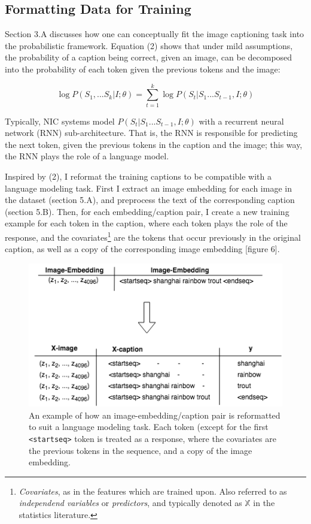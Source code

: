 \documentclass[letterpaper, 10 pt, conference]{ieeeconf}
\begin{document}
\subsection{Formatting Data for Training}

Section 3.A discusses how one can conceptually fit the image captioning task into the probabilistic framework. Equation (2) shows that under mild assumptions, the probability of a caption being correct, given an image, can be decomposed into the probability of each token given the previous tokens and the image: 

\begin{equation*}
\log P(S_1, ... S_k | I; \theta) = \sum_{t = 1}^k{\log P(S_t|S_1 ... S_{t-1}, I; \theta)}
\end{equation*}

Typically, NIC systems model $P(S_t|S_1 ... S_{t-1}, I; \theta)$ with a recurrent neural network (RNN) sub-architecture. That is, the RNN is responsible for predicting the next token, given the previous tokens in the caption and the image; this way, the RNN plays the role of a language model. 

Inspired by (2), I reformat the training captions to be compatible with a language modeling task. First I extract an image embedding for each image in the dataset (section 5.A), and preprocess the text of the corresponding caption (section 5.B). Then, for each embedding/caption pair, I create a new training example for each token in the caption, where each token plays the role of the response, and the  covariates\footnote{\textit{Covariates}, as in the features which are trained upon. Also referred to as \textit{independend variables} or \textit{predictors}, and typically denoted as $\mathbb{X}$ in the statistics literature.} are the tokens that occur previously in the original caption, as well as a copy of the corresponding image embedding [figure 6].

\begin{figure}[H]
\centering
\includegraphics[width=1\linewidth]{caption_expand}
\caption{An example of how an image-embedding/caption pair is reformatted to suit a language modeling task. Each token (except for the first \texttt{<startseq>} token is treated as a response, where the covariates are the previous tokens in the sequence, and a copy of the image embedding.}
\label{fig:test1}
\end{figure}
\end{document}
